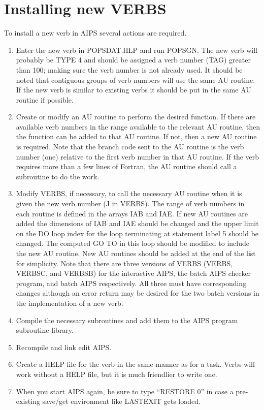 \section{Installing new VERBS}
To install a new verb in AIPS several actions are required.
\begin{enumerate} %
\item Enter the new verb in POPSDAT.HLP and run POPSGN.  The new verb will
probably be TYPE 4 and should be assigned a verb number (TAG) greater
than 100; making sure the verb number is not already used.  It should
be noted that contiguous groups of verb numbers will use the same AU
routine.  If the new verb is similar to existing verbs it should be
put in the same AU routine if possible.
\item Create or modify an AU routine to perform the desired function. If
there are available verb numbers in the range available to the
relevant AU routine, then the function can be added to that AU
routine.  If not, then a new AU routine is required.  Note that the
branch code sent to the AU routine is the verb number (one) relative
to the first verb number in that AU routine.  If the verb requires
more than a few lines of Fortran, the AU routine should call a
subroutine to do the work.
\item Modify VERBS, if necessary, to call the necessary AU routine when it
is given the new verb number (J in VERBS).  The range of verb numbers
in each routine is defined in the arrays IAB and IAE.  If new AU
routines are added the dimensions of IAB and IAE should be changed and
the upper limit on the DO loop index for the loop terminating at
statement label 5 should be changed.  The computed GO TO in this loop
should be modified to include the new AU routine. New AU routines
should be added at the end of the list for simplicity.  Note that
there are three versions of VERBS (VERBS, VERBSC, and VERBSB) for the
interactive AIPS, the batch AIPS checker program, and batch AIPS
respectively.  All three must have corresponding changes although an
error return may be desired for the two batch versions in the
implementation of a new verb.
\item Compile the necessary subroutines and add them to the AIPS program
subroutine library.
\item Recompile and link edit AIPS.
\item Create a HELP file for the verb in the same manner as for a task.
Verbs will work without a HELP file, but it is much friendlier to
write one.
\item When you start AIPS again, be sure to type ``RESTORE 0'' in case
a pre-existing save/get environment like LASTEXIT gets loaded.

\end{enumerate} %
